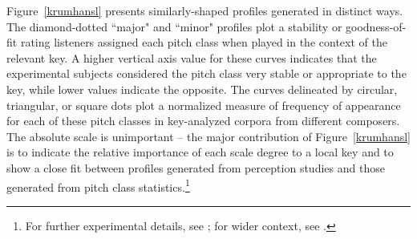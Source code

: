Figure~\ref{krumhansl} presents similarly-shaped profiles generated in distinct ways.  The diamond-dotted ``major" and ``minor" profiles plot a stability or goodness-of-fit rating listeners assigned each pitch class when played in the context of the relevant key.  A higher vertical axis value for these curves indicates that the experimental subjects considered the pitch class very stable or appropriate to the key, while lower values indicate the opposite.  The curves delineated by circular, triangular, or square dots plot a normalized measure of frequency of appearance for each of these pitch classes in key-analyzed corpora from different composers.  The absolute scale is unimportant -- the major contribution of Figure~\ref{krumhansl} is to indicate the relative importance of each scale degree to a local key and to show a close fit between profiles generated from perception studies and those generated from pitch class statistics.\footnote{For further experimental details, see \cite{krumhansl1982}; for wider context, see \cite{krumhansl1990}.}

